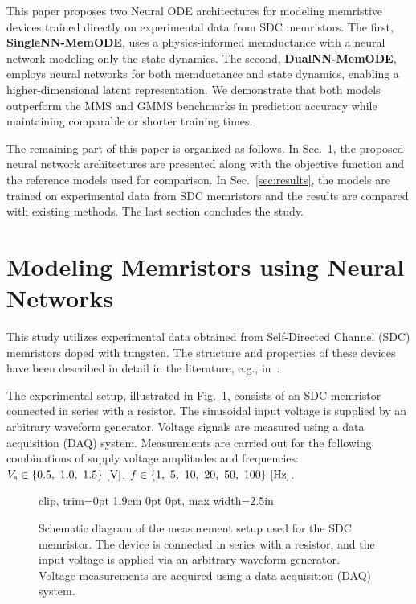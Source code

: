 \documentclass[a4,journal]{IEEEtran}
\newcommand{\Vs}{V_{\rm s}}
\newcommand{\MemODEOne}{SingleNN-MemODE}
\newcommand{\MemODETwo}{DualNN-MemODE}
\begin{document}
This paper proposes two Neural ODE architectures for modeling memristive devices trained directly on experimental data from SDC memristors. The first, \textbf{\MemODEOne}, uses a physics-informed memductance with a neural network modeling only the state dynamics. The second, \textbf{\MemODETwo}, employs neural networks for both memductance and state dynamics, enabling a higher-dimensional latent representation. We demonstrate that both models  outperform the MMS and GMMS benchmarks in prediction accuracy while maintaining comparable or shorter training times.

The remaining part of this paper is organized as follows. In Sec.~\ref{sec:NNModeling}, the proposed neural network architectures are presented along with the objective function and the reference models used for comparison. In Sec.~\ref{sec:results}, the models are trained on experimental data from SDC memristors and the results are compared with existing methods. The last section concludes the study.
\section{Modeling Memristors using Neural Networks}
\label{sec:NNModeling}
\noindent This study utilizes experimental data obtained from Self-Directed Channel (SDC) memristors doped with tungsten. The structure and properties of these devices have been described in detail in the literature, e.g., in~\cite{Campbell2017}.

The experimental setup, illustrated in Fig.~\ref{fig:memristor_setup}, consists of an SDC memristor connected in series with a resistor. The sinusoidal input voltage is supplied by an arbitrary waveform generator. Voltage signals are measured using a data acquisition (DAQ) system.
%
Measurements are carried out for the following combinations of supply voltage amplitudes and frequencies: \(\Vs  \in \{0.5,\ 1.0,\ 1.5\}~[{\rm V}]\), \(f \in \{1,\ 5,\ 10,\ 20,\ 50,\ 100\}~[\rm Hz]\).


\begin{figure}[httbp]
  \centering
  \begin{adjustbox}{clip, trim=0pt 1.9cm 0pt 0pt, max width=2.5in}
    
  \end{adjustbox}
  \caption{Schematic diagram of the measurement setup used for the SDC memristor. The device is connected in series with a resistor, and the input voltage is applied via an arbitrary waveform generator. Voltage measurements are acquired using a data acquisition (DAQ) system.}
  \label{fig:memristor_setup}
\end{figure}
\end{document}
